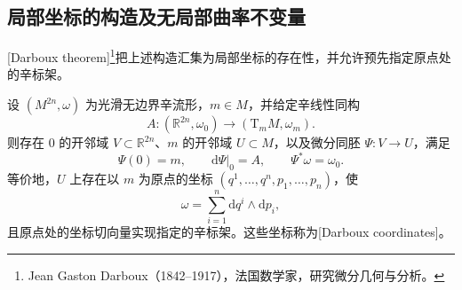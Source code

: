 \subsection{局部坐标的构造及无局部曲率不变量}
\label{g4:subsec:0802:04}

[Darboux theorem]\footnote{Jean Gaston Darboux（1842--1917），法国数学家，研究微分几何与分析。}把上述构造汇集为局部坐标的存在性，并允许预先指定原点处的辛标架。

\begin{theorem}[Darboux 定理]
	\label{g4:thm:0802:darboux}
	设 \((M^{2n},\omega)\) 为光滑无边界辛流形，\(m\in M\)，并给定辛线性同构
	\[
		A:(\mathbb R^{2n},\omega_0)\longrightarrow
		(\mathrm{T}_mM,\omega_m).
	\]
	则存在 \(0\) 的开邻域 \(V\subset\mathbb R^{2n}\)、\(m\) 的开邻域 \(U\subset M\)，以及微分同胚 \(\Psi:V\to U\)，满足
	\[
		\Psi(0)=m,\qquad \mathrm{d}\Psi|_0=A,\qquad
		\Psi^*\omega=\omega_0.
	\]
	等价地，\(U\) 上存在以 \(m\) 为原点的坐标 \((q^1,\ldots,q^n,p_1,\ldots,p_n)\)，使
	\[
		\omega=\sum_{i=1}^n\mathrm{d}q^i\wedge\mathrm{d}p_i,
	\]
	且原点处的坐标切向量实现指定的辛标架。这些坐标称为[Darboux coordinates]。
\end{theorem}
